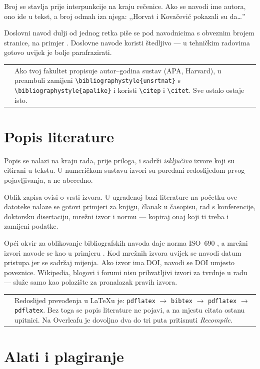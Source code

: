 \documentclass[12pt,a4paper,oneside]{report}
\makeatletter
\newcommand{\napomena}[1]{%
  \par\vspace{6pt}
  \noindent\begin{tabular}{@{}p{3pt}@{\hspace{10pt}}p{\dimexpr\textwidth-13pt\relax}@{}}
  \cellcolor{fakplava} & \small #1
  \end{tabular}\par\vspace{6pt}}
\makeatother
\begin{document}
Broj se stavlja prije interpunkcije na kraju rečenice. Ako se navodi ime autora, ono ide u tekst, a broj odmah iza njega: ,,Horvat i Kovačević \citep{clanak2023} pokazali su da\ldots''

Doslovni navod dulji od jednog retka piše se pod navodnicima s obveznim brojem stranice, na primjer \citep[str.~118]{clanak2023}. Doslovne navode koristi štedljivo — u tehničkim radovima gotovo uvijek je bolje parafrazirati.

\napomena{Ako tvoj fakultet propisuje autor–godina sustav (APA, Harvard), u preambuli zamijeni \texttt{\textbackslash bibliographystyle\{unsrtnat\}} s \texttt{\textbackslash bibliographystyle\{apalike\}} i koristi \texttt{\textbackslash citep} i \texttt{\textbackslash citet}. Sve ostalo ostaje isto.}

\section{Popis literature}

Popis se nalazi na kraju rada, prije priloga, i sadrži \emph{isključivo} izvore koji su citirani u tekstu. U numeričkom sustavu izvori su poredani redoslijedom prvog pojavljivanja, a ne abecedno.

Oblik zapisa ovisi o vrsti izvora. U ugrađenoj bazi literature na početku ove datoteke nalaze se gotovi primjeri za knjigu, članak u časopisu, rad s konferencije, doktorsku disertaciju, mrežni izvor i normu — kopiraj onaj koji ti treba i zamijeni podatke.

Opći okvir za oblikovanje bibliografskih navoda daje norma ISO~690 \citep{norma2019}, a mrežni izvori navode se kao u primjeru \citep{mreznistvor2024}. Kod mrežnih izvora uvijek se navodi datum pristupa jer se sadržaj mijenja. Ako izvor ima DOI, navodi se DOI umjesto poveznice. Wikipedia, blogovi i forumi nisu prihvatljivi izvori za tvrdnje u radu — služe samo kao polazište za pronalazak pravih izvora.

\napomena{Redoslijed prevođenja u LaTeXu je: \texttt{pdflatex} $\rightarrow$ \texttt{bibtex} $\rightarrow$ \texttt{pdflatex} $\rightarrow$ \texttt{pdflatex}. Bez toga se popis literature ne pojavi, a na mjestu citata ostanu upitnici. Na Overleafu je dovoljno dva do tri puta pritisnuti \emph{Recompile}.}

\section{Alati i plagiranje}
\end{document}
